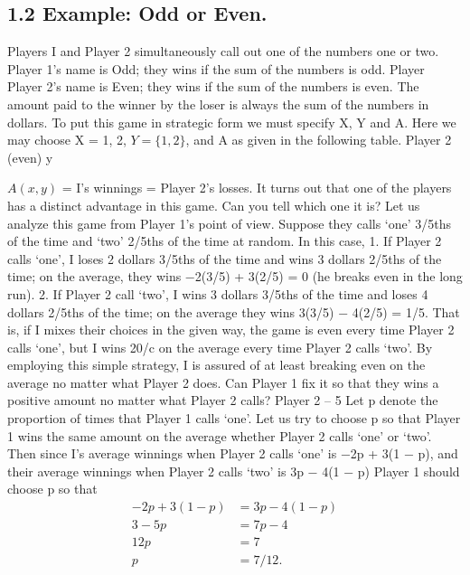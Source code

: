 \documentclass[]{report}
\begin{document}
\subsection{1.2 Example: Odd or Even.} Players I and Player 2 simultaneously call out one of the
numbers one or two. Player 1’s name is Odd; they wins if the sum of the numbers is odd.
Player Player 2’s name is Even; they wins if the sum of the numbers is even. The amount paid to
the winner by the loser is always the sum of the numbers in dollars. To put this game in
strategic form we must specify X, Y and A. Here we may choose X = {1, 2}, $Y = \{1, 2\}$,
and A as given in the following table.
Player 2 (even) y


$A(x, y)$ = I’s winnings = Player 2’s losses.
It turns out that one of the players has a distinct advantage in this game. Can you
tell which one it is?
Let us analyze this game from Player 1’s point of view. Suppose they calls ‘one’ 3/5ths
of the time and ‘two’ 2/5ths of the time at random. In this case,
1. If Player 2 calls ‘one’, I loses 2 dollars 3/5ths of the time and wins 3 dollars 2/5ths of the
time; on the average, they wins −2(3/5) + 3(2/5) = 0 (he breaks even in the long run).
2. If Player 2 call ‘two’, I wins 3 dollars 3/5ths of the time and loses 4 dollars 2/5ths of the time;
on the average they wins 3(3/5) − 4(2/5) = 1/5.
That is, if I mixes their choices in the given way, the game is even every time Player 2 calls
‘one’, but I wins 20/c on the average every time Player 2 calls ‘two’. By employing this simple
strategy, I is assured of at least breaking even on the average no matter what Player 2 does. Can
Player 1 fix it so that they wins a positive amount no matter what Player 2 calls?
Player 2 – 5
Let p denote the proportion of times that Player 1 calls ‘one’. Let us try to choose p
so that Player 1 wins the same amount on the average whether Player 2 calls ‘one’ or ‘two’. Then
since I’s average winnings when Player 2 calls ‘one’ is −2p + 3(1 − p), and their average winnings
when Player 2 calls ‘two’ is 3p − 4(1 − p) Player 1 should choose p so that
\begin{eqnarray}
−2p + 3(1 − p) & =3p − 4(1 − p)\\
3 − 5p & = 7p − 4\\
12p &= 7\\
p & = 7/12.\\
\end{eqnarray}
\end{document}
